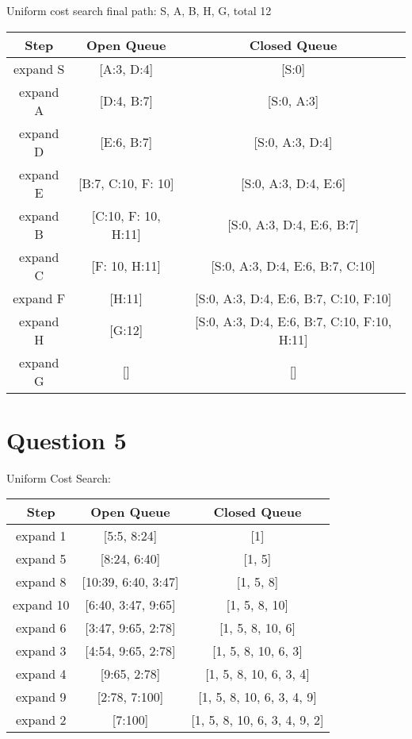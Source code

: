 \documentclass[12pt]{article}
\begin{document}
Uniform cost search final path: S, A, B, H, G, total 12
\begin{center}
  \begin{tabular}{|c|c|c|}
    \hline
    \textbf{Step} & \textbf{Open Queue} & \textbf{Closed Queue} \\ \hline
    expand S & [A:3, D:4] & [S:0] \\ \hline
    expand A & [D:4, B:7] & [S:0, A:3] \\ \hline
    expand D & [E:6, B:7] & [S:0, A:3, D:4] \\ \hline
    expand E & [B:7, C:10, F: 10] & [S:0, A:3, D:4, E:6] \\ \hline
    expand B & [C:10, F: 10, H:11] & [S:0, A:3, D:4, E:6, B:7] \\ \hline
    expand C & [F: 10, H:11] & [S:0, A:3, D:4, E:6, B:7, C:10] \\ \hline
    expand F & [H:11] & [S:0, A:3, D:4, E:6, B:7, C:10, F:10] \\ \hline
    expand H & [G:12] & [S:0, A:3, D:4, E:6, B:7, C:10, F:10, H:11] \\ \hline
    expand G & [] & [] \\ \hline
  \end{tabular}
\end{center}


\section*{Question 5} %
\label{sec:question_5}
Uniform Cost Search:
\begin{center}
  \begin{tabular}{|c|c|c|}
    \hline
    \textbf{Step} & \textbf{Open Queue} & \textbf{Closed Queue} \\ \hline
    expand 1 & [5:5, 8:24] & [1] \\ \hline
    expand 5 & [8:24, 6:40] & [1, 5] \\ \hline
    expand 8 & [10:39, 6:40, 3:47] & [1, 5, 8] \\ \hline
    expand 10 & [6:40, 3:47, 9:65] & [1, 5, 8, 10] \\ \hline
    expand 6 & [3:47, 9:65, 2:78] & [1, 5, 8, 10, 6] \\ \hline
    expand 3 & [4:54, 9:65, 2:78] & [1, 5, 8, 10, 6, 3] \\ \hline
    expand 4 & [9:65, 2:78] & [1, 5, 8, 10, 6, 3, 4] \\ \hline
    expand 9 & [2:78, 7:100] & [1, 5, 8, 10, 6, 3, 4, 9] \\ \hline
    expand 2 & [7:100] & [1, 5, 8, 10, 6, 3, 4, 9, 2] \\ \hline
  \end{tabular}
\end{center}
\end{document}
